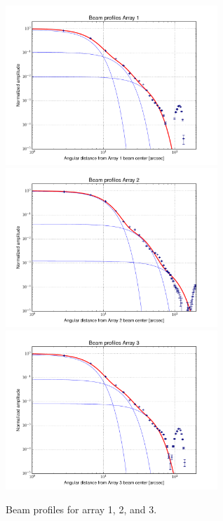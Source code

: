 \begin{figure}[h!]
\centering
\includegraphics[height=6cm]{Figures/Beam_profiles_A1_FR.pdf}
\hspace{0.5cm}
\includegraphics[height=6cm]{Figures/Beam_profiles_A2_FR.pdf}
\hspace{0.5cm}
\includegraphics[height=6cm]{Figures/Beam_profiles_A3_FR.pdf}
\caption{Beam profiles for array 1, 2, and 3.}
\label{fig:beam_profiles_3G}
\end{figure}

